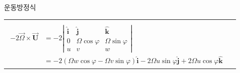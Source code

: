 \begin{frame}[t]{운동방정식}
\begin{tabular}{ll}
\begin{minipage}[t]{0.6\textwidth}
				$\boldsymbol {\vec{U}} = u \boldsymbol {\hat{i}} + v\boldsymbol {\hat{j}} + w\boldsymbol {\hat{k}}$이므로\\
				$${\displaystyle	{
						\begin{aligned}
							-2 \vec{\Omega} \times \boldsymbol{\vec{U}}
							& =
							-2\left|\begin{array}{ccc}\boldsymbol {\hat{i}} & \boldsymbol {\hat{j}} & \boldsymbol {\hat{k}} \\ 0 & \Omega \cos \varphi & \Omega \sin \varphi \\ u & v & w\end{array}\right|\\
							& =-2(\Omega w \cos \varphi-\Omega v \sin \varphi) \boldsymbol {\hat{i}}-2 \Omega u \sin \varphi \boldsymbol {\hat{j}}+2 \Omega u \cos \varphi \boldsymbol {\hat{k}}
						\end{aligned}
				}	}$$
				

		\end{minipage}
	\end{tabular}
\end{frame}





